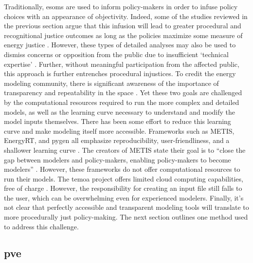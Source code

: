 Traditionally, \acp{esom} are used to inform policy-makers \cite{li_open_2020}
in order to infuse policy choices with an appearance of objectivity. Indeed,
some of the studies reviewed in the previous section argue that this infusion
will lead to greater procedural and recognitional justice outcomes as long as
the policies maximize some measure of energy justice
\cite{chapman_prioritizing_2018, heffron_resolving_2015}. However, these types
of detailed analyses may also be used to dismiss concerns or opposition from the
public due to insufficient `technical expertise' \cite{johnson_dakota_2021}.
Further, without meaningful participation from the affected public, this
approach is further entrenches procedural injustices. To credit the energy
modeling community, there is significant awareness of the importance of
transparency and repeatability in the space \cite{decarolis_case_2012,
pfenninger_energy_2014, pfenninger_openmod_nodate, forster_open_2022,
hilpert_open_2018}. Yet these two goals are challenged by the computational
resources required to run the more complex and detailed models, as well as the
learning curve necessary to understand and modify the model inputs themselves.
There has been some effort to reduce this learning curve and make modeling
itself more accessible. Frameworks such as METIS, EnergyRT, and \ac{pygen} all
emphasize reproducibility, user-friendliness, and a shallower learning curve
\cite{sakellaris_metis_2018, lugovoy_energyrt_2022, dotson_python_2021}. The
creators of METIS state their goal is to ``close the gap between modelers and
policy-makers, enabling policy-makers to become modelers''
\cite{sakellaris_metis_2018}. However, these frameworks do not offer
computational resources to run their models. The \ac{temoa} project offers
limited cloud computing capabilities, free of charge
\cite{temoa_project_temoa_2023}. However, the responsibility for creating an
input file still falls to the user, which can be overwhelming even for
experienced modelers. Finally, it's not clear that perfectly accessible and
transparent modeling tools will translate to more procedurally just
policy-making. The next section outlines one method used to address this
challenge.

\subsection{\Acl{pve}}


